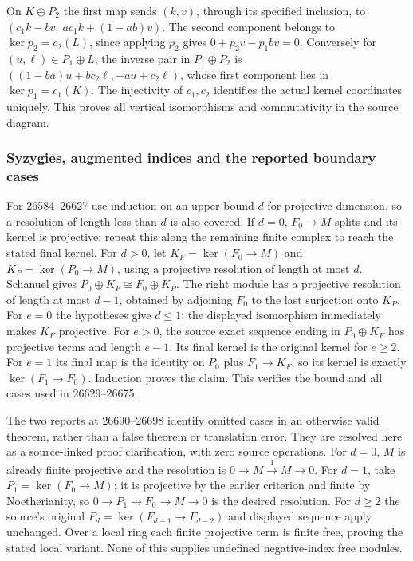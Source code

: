 On \(K\oplus P_2\) the first map sends \((k,v)\), through its specified inclusion, to \((c_1k-bv,\ ac_1k+(1-ab)v)\). The second component belongs to \(\ker p_2=c_2(L)\), since applying \(p_2\) gives \(0+p_2v-p_1bv=0\). Conversely for \((u,\ell)\in P_1\oplus L\), the inverse pair in \(P_1\oplus P_2\) is \(((1-ba)u+bc_2\ell,-au+c_2\ell)\), whose first component lies in \(\ker p_1=c_1(K)\). The injectivity of \(c_1,c_2\) identifies the actual kernel coordinates uniquely. This proves all vertical isomorphisms and commutativity in the source diagram.

\subsubsection{Syzygies, augmented indices and the reported boundary cases}\label{algebra-proof-022-syzygies-augmented-indices-and-the-reported-boundary-cases}

For 26584--26627 use induction on an upper bound \(d\) for projective dimension, so a resolution of length less than \(d\) is also covered. If \(d=0\), \(F_0\to M\) splits and its kernel is projective; repeat this along the remaining finite complex to reach the stated final kernel. For \(d>0\), let \(K_F=\ker(F_0\to M)\) and \(K_P=\ker(P_0\to M)\), using a projective resolution of length at most \(d\). Schanuel gives \(P_0\oplus K_F\cong F_0\oplus K_P\). The right module has a projective resolution of length at most \(d-1\), obtained by adjoining \(F_0\) to the last surjection onto \(K_P\). For \(e=0\) the hypotheses give \(d\le1\); the displayed isomorphism immediately makes \(K_F\) projective. For \(e>0\), the source exact sequence ending in \(P_0\oplus K_F\) has projective terms and length \(e-1\). Its final kernel is the original kernel for \(e\ge2\). For \(e=1\) its final map is the identity on \(P_0\) plus \(F_1\to K_F\), so its kernel is exactly \(\ker(F_1\to F_0)\). Induction proves the claim. This verifies the bound and all cases used in 26629--26675.

The two reports at 26690--26698 identify omitted cases in an otherwise valid theorem, rather than a false theorem or translation error. They are resolved here as a source-linked proof clarification, with zero source operations. For \(d=0\), \(M\) is already finite projective and the resolution is \(0\to M\xrightarrow{1}M\to0\). For \(d=1\), take \(P_1=\ker(F_0\to M)\); it is projective by the earlier criterion and finite by Noetherianity, so \(0\to P_1\to F_0\to M\to0\) is the desired resolution. For \(d\ge2\) the source's original \(P_d=\ker(F_{d-1}\to F_{d-2})\) and displayed sequence apply unchanged. Over a local ring each finite projective term is finite free, proving the stated local variant. None of this supplies undefined negative-index free modules.


